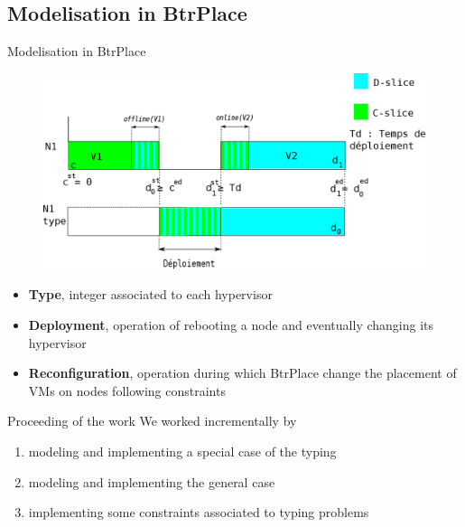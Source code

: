 \documentclass{beamer}
\begin{document}
\subsection{Modelisation in BtrPlace}
\begin{frame}{Modelisation in BtrPlace}
\begin{figure}[!ht]
	\centering
	\includegraphics[scale=.4]{imgs/config.eps}
\end{figure}
\begin{itemize}
	\item{\textbf{Type}}, integer associated to each hypervisor
	\item{\textbf{Deployment}}, operation of rebooting a node and
		eventually changing its hypervisor
	\item{\textbf{Reconfiguration}}, operation during which BtrPlace
		change the placement of VMs on nodes following constraints
\end{itemize}
\end{frame}
\begin{frame}{Proceeding of the work}
We worked incrementally by
\begin{enumerate}
	 \item modeling and implementing a special case of the typing
	 \item modeling and implementing the general case
	 \item implementing some constraints associated to typing problems
\end{enumerate}
\end{frame}
\end{document}
